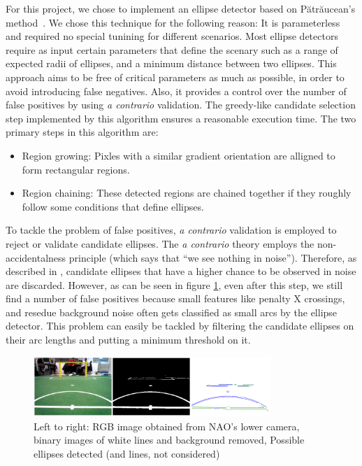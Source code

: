 \documentclass[	DIV=calc,%
							paper=a4,%
							fontsize=9pt,%
							twocolumn]{scrartcl}	 					%
\begin{document}
For this project, we chose to implement an ellipse detector based on P{\u{a}}tr{\u{a}}ucean's method~\cite{ED}. We chose this technique for the following reason: It is parameterless and required no special tunining for different scenarios. Most ellipse detectors require as input certain parameters that define the scenary such as a range of expected radii of ellipses, and a minimum distance between two ellipses. This approach aims to be free of critical parameters as much as possible, in order to avoid introducing false negatives. Also, it provides a control over the number of false positives by using \emph{a contrario} validation. The greedy-like candidate selection step implemented by this algorithm ensures a reasonable execution time. The two primary steps in this algorithm are: 

\begin{itemize}
\item Region growing: Pixles with a similar gradient orientation are alligned to form rectangular regions.
\item Region chaining: These detected regions are chained together if they roughly follow some conditions that define ellipses.
\end{itemize}

To tackle the problem of false positives, \emph{a contrario} validation is employed to reject or validate candidate ellipses. The \emph{a contrario} theory employs the non-accidentalness principle (which says that ``we see nothing in noise''). Therefore, as described in \cite{ED}, candidate ellipses that have a higher chance to be observed in noise are discarded. %
However, as can be seen in figure \ref{fig:ED}, even after this step, we still find a number of false positives because small features like penalty X crossings, and resedue background noise often gets classified as small arcs by the ellipse detector. This problem can easily be tackled by filtering the candidate ellipses on their arc lengths and putting a minimum threshold on it.

\begin{figure}
\includegraphics[width=254pt]{figures/ellipseDetection.png}
\caption{Left to right: RGB image obtained from NAO's lower camera, binary images of white lines and background removed, Possible ellipses detected (and lines, not considered) }
\label{fig:ED}
\end{figure}
\end{document}
